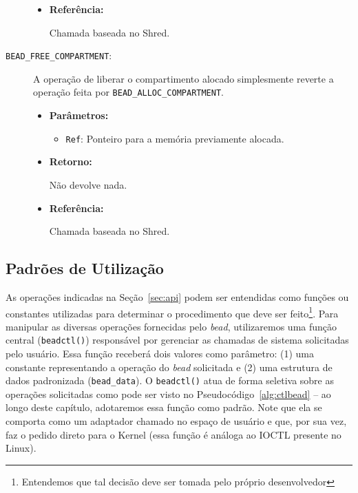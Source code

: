 \begin{description}
\begin{itemize}
    \item \textbf{Referência:}

Chamada baseada no Shred.

	\end{itemize}

  \item [\texttt{BEAD\_FREE\_COMPARTMENT}:]

A operação de liberar o compartimento alocado simplesmente reverte a operação
feita por \texttt{BEAD\_ALLOC\_COMPARTMENT}.

  \begin{itemize}
    \item \textbf{Parâmetros:}

    \begin{itemize}
      \item \texttt{Ref}: Ponteiro para a memória previamente alocada.
    \end{itemize}

    \item \textbf{Retorno:}

Não devolve nada.

    \item \textbf{Referência:}

Chamada baseada no Shred.

	\end{itemize}
\end{description}

\subsection{Padrões de Utilização}
\label{sec:padroes}

As operações indicadas na Seção~\ref{sec:api} podem ser entendidas como funções
ou constantes utilizadas para determinar o procedimento que deve ser
feito\footnote{Entendemos que tal decisão deve ser tomada pelo próprio
desenvolvedor}. Para manipular as diversas operações fornecidas pelo
\emph{bead}, utilizaremos uma função central (\texttt{beadctl()}) responsável
por gerenciar as chamadas de sistema solicitadas pelo usuário. Essa função
receberá dois valores como parâmetro: (1) uma constante representando a
operação do \emph{bead} solicitada e (2) uma estrutura de dados padronizada
(\texttt{bead\_data}). O \texttt{beadctl()} atua de forma seletiva sobre as
operações solicitadas como pode ser visto no Pseudocódigo~\ref{alg:ctlbead} --
ao longo deste capítulo, adotaremos essa função como padrão. Note que ela se
comporta como um adaptador chamado no espaço de usuário e que, por sua vez, faz
o pedido direto para o Kernel (essa função é análoga ao IOCTL presente no
Linux).

